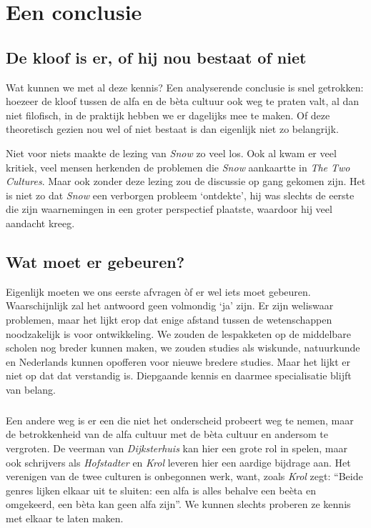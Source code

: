 \chapter{Een conclusie}


\section{De kloof is er, of hij nou bestaat of niet}

Wat kunnen we met al deze kennis? Een analyserende conclusie is snel getrokken: hoezeer de kloof tussen de alfa en de b\`eta cultuur ook weg te praten valt, al dan niet filofisch, in de praktijk hebben we er dagelijks mee te maken. Of deze theoretisch gezien nou wel of niet bestaat is dan eigenlijk niet zo belangrijk.

Niet voor niets maakte de lezing van \emph{Snow} zo veel los. Ook al kwam er veel kritiek, veel mensen herkenden de problemen die \emph{Snow} aankaartte in \emph{The Two Cultures}. Maar ook zonder deze lezing zou de discussie op gang gekomen zijn. Het is niet zo dat \emph{Snow} een verborgen probleem `ontdekte', hij was slechts de eerste die zijn waarnemingen in een groter perspectief plaatste, waardoor hij veel aandacht kreeg.


\section{Wat moet er gebeuren?}

Eigenlijk moeten we ons eerste afvragen \`of er wel iets moet gebeuren. Waarschijnlijk zal het antwoord geen volmondig `ja' zijn. Er zijn weliswaar problemen, maar het lijkt erop dat enige afstand tussen de wetenschappen noodzakelijk is voor ontwikkeling. We zouden de lespakketen op de middelbare scholen nog breder kunnen maken, we zouden studies als wiskunde, natuurkunde en Nederlands kunnen opofferen voor nieuwe bredere studies. Maar het lijkt er niet op dat dat verstandig is. Diepgaande kennis en daarmee specialisatie blijft van belang.

\paragraph{}

Een andere weg is er een die niet het onderscheid probeert weg te nemen, maar de betrokkenheid van de alfa cultuur met de b\`eta cultuur en andersom te vergroten. De veerman van \emph{Dijksterhuis} kan hier een grote rol in spelen, maar ook schrijvers als \emph{Hofstadter} en \emph{Krol} leveren hier een aardige bijdrage aan. Het verenigen van de twee culturen is onbegonnen werk, want, zoals \emph{Krol} zegt: ``Beide genres lijken elkaar uit te sluiten: een alfa is alles behalve een be\`eta en omgekeerd, een b\`eta kan geen alfa zijn''. We kunnen slechts proberen ze kennis met elkaar te laten maken.
